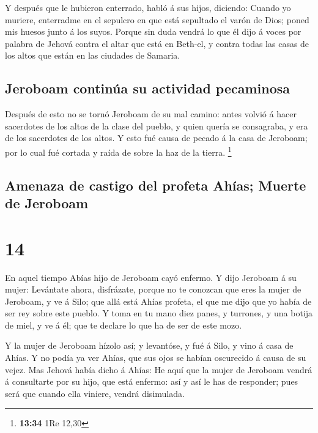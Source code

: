  Y después que le hubieron enterrado, habló á sus hijos,
diciendo: Cuando yo muriere, enterradme en el sepulcro en que está
sepultado el varón de Dios; poned mis huesos junto á los suyos.
 Porque sin duda vendrá lo que él dijo á voces por
palabra de Jehová contra el altar que está en Beth-el, y contra todas
las casas de los altos que están en las ciudades de Samaria.

\hypertarget{jeroboam-continuxfaa-su-actividad-pecaminosa}{%
\subsection{Jeroboam continúa su actividad
pecaminosa}\label{jeroboam-continuxfaa-su-actividad-pecaminosa}}

 Después de esto no se tornó Jeroboam de su mal camino:
antes volvió á hacer sacerdotes de los altos de la clase del pueblo, y
quien quería se consagraba, y era de los sacerdotes de los altos.
 Y esto fué causa de pecado á la casa de Jeroboam; por lo
cual fué cortada y raída de sobre la haz de la tierra. \footnote{\textbf{13:34}
  1Re 12,30}

\hypertarget{amenaza-de-castigo-del-profeta-ahuxedas-muerte-de-jeroboam}{%
\subsection{Amenaza de castigo del profeta Ahías; Muerte de
Jeroboam}\label{amenaza-de-castigo-del-profeta-ahuxedas-muerte-de-jeroboam}}

\hypertarget{section-13}{%
\section{14}\label{section-13}}

 En aquel tiempo Abías hijo de Jeroboam cayó enfermo.
 Y dijo Jeroboam á su mujer: Levántate ahora, disfrázate,
porque no te conozcan que eres la mujer de Jeroboam, y ve á Silo; que
allá está Ahías profeta, el que me dijo que yo había de ser rey sobre
este pueblo.  Y toma en tu mano diez panes, y turrones, y
una botija de miel, y ve á él; que te declare lo que ha de ser de este
mozo.

 Y la mujer de Jeroboam hízolo así; y levantóse, y fué á
Silo, y vino á casa de Ahías. Y no podía ya ver Ahías, que sus ojos se
habían oscurecido á causa de su vejez.  Mas Jehová había
dicho á Ahías: He aquí que la mujer de Jeroboam vendrá á consultarte por
su hijo, que está enfermo: así y así le has de responder; pues será que
cuando ella viniere, vendrá disimulada.

